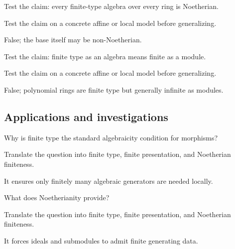 \begin{exercise}\label{exr:vi26-expand-11}
Test the claim: every finite-type algebra over every ring is Noetherian.
\end{exercise}
\begin{hint}
Test the claim on a concrete affine or local model before generalizing.
\end{hint}
\begin{solution}
False; the base itself may be non-Noetherian.
\end{solution}

\begin{exercise}\label{exr:vi26-expand-12}
Test the claim: finite type as an algebra means finite as a module.
\end{exercise}
\begin{hint}
Test the claim on a concrete affine or local model before generalizing.
\end{hint}
\begin{solution}
False; polynomial rings are finite type but generally infinite as modules.
\end{solution}

\subsection*{Applications and investigations}

\begin{exercise}\label{exr:vi26-expand-13}
Why is finite type the standard algebraicity condition for morphisms?
\end{exercise}
\begin{hint}
Translate the question into finite type, finite presentation, and Noetherian finiteness.
\end{hint}
\begin{solution}
It ensures only finitely many algebraic generators are needed locally.
\end{solution}

\begin{exercise}\label{exr:vi26-expand-14}
What does Noetherianity provide?
\end{exercise}
\begin{hint}
Translate the question into finite type, finite presentation, and Noetherian finiteness.
\end{hint}
\begin{solution}
It forces ideals and submodules to admit finite generating data.
\end{solution}


